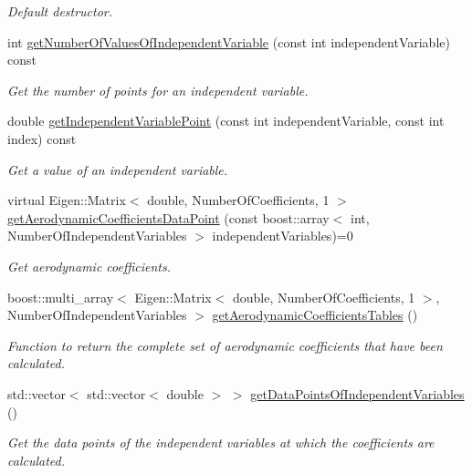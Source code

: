 \begin{DoxyCompactItemize}
\begin{DoxyCompactList}\small\item\em Default destructor. \end{DoxyCompactList}\item 
int \hyperlink{classtudat_1_1aerodynamics_1_1AerodynamicCoefficientGenerator_a8318f5ba6cb5c7f5018f3ba93ab6c24a}{get\+Number\+Of\+Values\+Of\+Independent\+Variable} (const int independent\+Variable) const 
\begin{DoxyCompactList}\small\item\em Get the number of points for an independent variable. \end{DoxyCompactList}\item 
double \hyperlink{classtudat_1_1aerodynamics_1_1AerodynamicCoefficientGenerator_a948245afaafaa8b31d77b9660bf8d3dd}{get\+Independent\+Variable\+Point} (const int independent\+Variable, const int index) const 
\begin{DoxyCompactList}\small\item\em Get a value of an independent variable. \end{DoxyCompactList}\item 
virtual Eigen\+::\+Matrix$<$ double, Number\+Of\+Coefficients, 1 $>$ \hyperlink{classtudat_1_1aerodynamics_1_1AerodynamicCoefficientGenerator_abb510c0b6d78349c6e41658ea8b63bc8}{get\+Aerodynamic\+Coefficients\+Data\+Point} (const boost\+::array$<$ int, Number\+Of\+Independent\+Variables $>$ independent\+Variables)=0
\begin{DoxyCompactList}\small\item\em Get aerodynamic coefficients. \end{DoxyCompactList}\item 
boost\+::multi\+\_\+array$<$ Eigen\+::\+Matrix$<$ double, Number\+Of\+Coefficients, 1 $>$, Number\+Of\+Independent\+Variables $>$ \hyperlink{classtudat_1_1aerodynamics_1_1AerodynamicCoefficientGenerator_a8d45750ac8b56931b3ee805cefd5a9da}{get\+Aerodynamic\+Coefficients\+Tables} ()
\begin{DoxyCompactList}\small\item\em Function to return the complete set of aerodynamic coefficients that have been calculated. \end{DoxyCompactList}\item 
std\+::vector$<$ std\+::vector$<$ double $>$ $>$ \hyperlink{classtudat_1_1aerodynamics_1_1AerodynamicCoefficientGenerator_aa114019ee49550774f570990712ddbfd}{get\+Data\+Points\+Of\+Independent\+Variables} ()
\begin{DoxyCompactList}\small\item\em Get the data points of the independent variables at which the coefficients are calculated. \end{DoxyCompactList}\item 

\end{DoxyCompactItemize}
